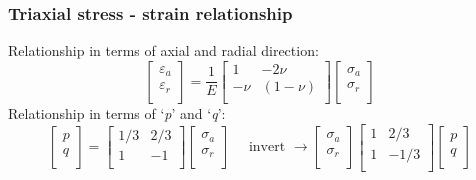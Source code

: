 \documentclass[notes]{beamer}
\begin{document}
\begin{frame}
\frametitle{Triaxial stress - strain relationship}
Relationship in terms of axial and radial direction:
\begin{equation}
	\begin{bmatrix}
		\varepsilon_a \\
		\varepsilon_r \\
	\end{bmatrix}%
	=%
	\frac{1}{E}%
	\begin{bmatrix}
		1 & - 2\nu\\
		-\nu & (1-\nu)\\
	\end{bmatrix}%
	\begin{bmatrix}
		\sigma_a \\
		\sigma_r \\
	\end{bmatrix}
	\label{eq:strain-stress}
\end{equation}
Relationship in terms of `\textit{p}' and `\textit{q}':
\begin{equation}
	\begin{bmatrix}
		p \\
		q \\
	\end{bmatrix}%
	=%
	\begin{bmatrix}
	1/3 &  2/3\\
	1   & -1\\
	\end{bmatrix}%
	\begin{bmatrix}
	\sigma_a \\
	\sigma_r \\
	\end{bmatrix}%
	\quad
	\text{ invert }
	\rightarrow
	\begin{bmatrix}
		\sigma_a \\
		\sigma_r \\
	\end{bmatrix}%
	\begin{bmatrix}
		1   &  2/3\\
		1   & -1/3\\
	\end{bmatrix}%
	\begin{bmatrix}
		p \\
		q \\
	\end{bmatrix}%
	\label{eq:pq-strain}
\end{equation}


\end{frame}
\end{document}
